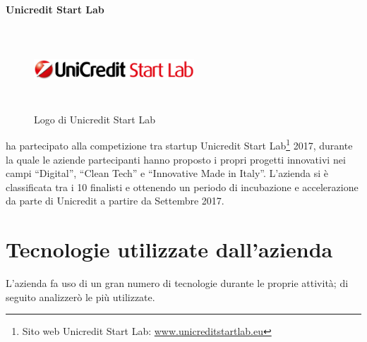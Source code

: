    \paragraph{Unicredit Start Lab}
   \begin{figure}[H]
      \begin{center}
         \includegraphics[width=6cm,height=3cm,keepaspectratio]{immagini/unicreditstartlab-logo}
      \end{center}
      \caption{Logo di Unicredit Start Lab}\label{logounicreditstartlab}
   \end{figure}
   \nomeAzienda{} ha partecipato alla competizione tra startup Unicredit Start Lab\footnote{Sito web Unicredit Start Lab: \href{www.unicreditstartlab.eu}{www.unicreditstartlab.eu}} 2017, durante la quale le aziende partecipanti hanno proposto i propri progetti innovativi nei campi ``Digital'', ``Clean Tech'' e ``Innovative Made in Italy''. L'azienda si è classificata tra i 10 finalisti e ottenendo un periodo di incubazione e accelerazione da parte di Unicredit a partire da Settembre 2017.

\section{Tecnologie utilizzate dall'azienda}
L'azienda fa uso di un gran numero di tecnologie durante le proprie attività; di seguito analizzerò le più utilizzate.

